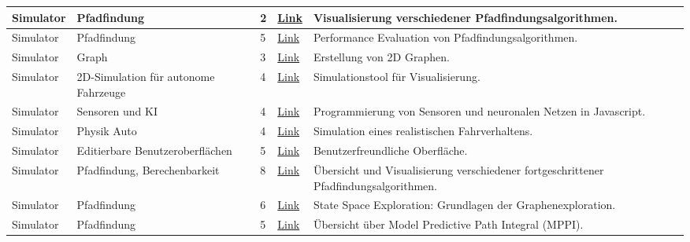 \documentclass[main.tex]{subfiles} %
\begin{document}
\begin{longtable}{@{} L{2.5cm} L{2.9cm} C{1cm} L{1.2cm} L{6cm} @{}}
Simulator & Pfadfindung & 2 & \href{https://clementmihailescu.github.io/Pathfinding-Visualizer/\#}{Link} & Visualisierung verschiedener Pfadfindungsalgorithmen. \\
\hline
Simulator & Pfadfindung & 5 & \href{https://scholar.uwindsor.ca/cgi/viewcontent.cgi?article=9230\&context=etd}{Link} & Performance Evaluation von Pfadfindungsalgorithmen. \\
\hline
Simulator & Graph & 3 & \href{https://visjs.github.io/vis-network/examples/}{Link} & Erstellung von 2D Graphen. \\
\hline
Simulator & 2D-Simulation für autonome Fahrzeuge & 4 & \href{https://docs.unity3d.com/Simulation/manual/author/create-a-vehicle-model.html}{Link} & Simulationstool für Visualisierung. \\
\hline
Simulator & Sensoren und KI & 4 & \href{https://medium.com/@krish.bhoopati556/coding-the-road-ahead-self-driving-cars-with-javascript-and-ai-1995ecb2c1ec}{Link} & Programmierung von Sensoren und neuronalen Netzen in Javascript. \\
\hline
Simulator & Physik Auto & 4 & \href{https://www.asawicki.info/Mirror/Car\%20Physics\%20for\%20Games/Car\%20Physics\%20for\%20Games.html}{Link} & Simulation eines realistischen Fahrverhaltens. \\
\hline
Simulator & Editierbare Benutzeroberflächen & 5 & \href{https://github.com/tpan496/csgraph\_editor}{Link} & Benutzerfreundliche Oberfläche. \\
\hline
Simulator & Pfadfindung, Berechenbarkeit & 8 & \href{https://moribots.github.io/project/motion-planning}{Link} & Übersicht und Visualisierung verschiedener fortgeschrittener Pfadfindungsalgorithmen. \\
\hline
Simulator & Pfadfindung & 6 & \href{https://www.mcrl2.org/web/\_downloads/08c5ec296da673df304284f04f0e815a/state-space-exploration.pdf}{Link} & State Space Exploration: Grundlagen der Graphenexploration. \\
\hline
Simulator & Pfadfindung & 5 & \href{https://sites.gatech.edu/acds/mppi/}{Link} & Übersicht über Model Predictive Path Integral (MPPI). \\


\end{longtable}
\end{document}
